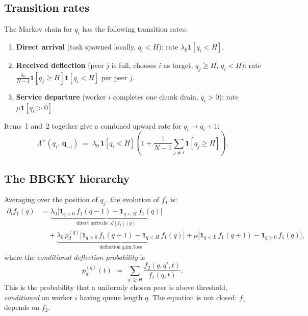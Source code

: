 \documentclass[11pt,a4paper]{report}
\newcommand{\pd}{p_d}
\newcommand{\fone}{f_1}
\newcommand{\ftwo}{f_2}
\newcommand{\cL}{\mathcal{L}}
\begin{document}
\subsection{Transition rates}
\label{sec:mmp-rates}

The Markov chain for $q_i$ has the following transition rates:

\begin{enumerate}
  \item \textbf{Direct arrival} (task spawned locally, $q_i < H$):
        rate $\lambda_0 \mathbf{1}[q_i < H]$.

  \item \textbf{Received deflection} (peer $j$ is full, chooses $i$ as target,
        $q_j \geq H$, $q_i < H$):
        rate $\frac{\lambda_0}{N-1} \mathbf{1}[q_j \geq H] \mathbf{1}[q_i < H]$
        per peer $j$.

  \item \textbf{Service departure} (worker $i$ completes one chunk drain,
        $q_i > 0$):
        rate $\mu \mathbf{1}[q_i > 0]$.
\end{enumerate}

Items~1 and~2 together give a combined upward rate for $q_i \to q_i + 1$:
\[
  \Lambda^+(q_i,\, \mathbf{q}_{-i})
  \;=\; \lambda_0\, \mathbf{1}[q_i < H]
  \left(1 + \frac{1}{N-1}\sum_{j \neq i} \mathbf{1}[q_j \geq H]\right).
\]

\subsection{The BBGKY hierarchy}

Averaging over the position of $q_j$, the evolution of $\fone$ is:
\begin{align}
  \partial_t \fone(q)
  &= \underbrace{
    \lambda_0\bigl[\mathbf{1}_{q>0}\,\fone(q-1)
    - \mathbf{1}_{q<H}\,\fone(q)\bigr]
  }_{\text{direct arrivals: }\cL[\fone](q)}
  \nonumber\\
  &\quad
  + \underbrace{
    \lambda_0\,\pd^{(q)}\bigl[
      \mathbf{1}_{q>0}\,\fone(q-1) - \mathbf{1}_{q<H}\,\fone(q)
    \bigr]
  }_{\text{deflection gain/loss}}
  + \mu\bigl[\mathbf{1}_{q<L}\,\fone(q+1) - \mathbf{1}_{q>0}\,\fone(q)\bigr],
  \label{eq:bbgky1}
\end{align}
where the \emph{conditional deflection probability} is
\begin{equation}
  \pd^{(q)}(t)
  \;\coloneqq\; \sum_{q' \geq H} \frac{\ftwo(q, q', t)}{\fone(q, t)}.
  \label{eq:cond-pd}
\end{equation}
This is the probability that a uniformly chosen peer is above threshold,
\emph{conditioned} on worker $i$ having queue length $q$.
The equation is not closed: $\fone$ depends on $\ftwo$.
\end{document}
